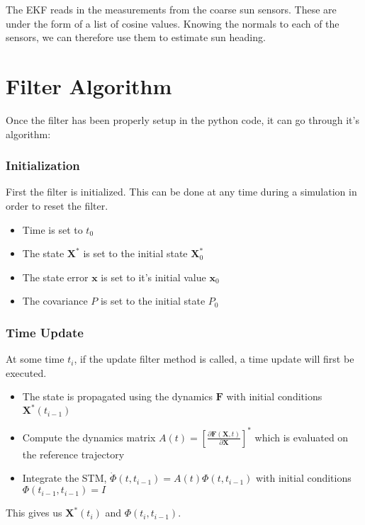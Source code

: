 \documentclass[]{BasiliskReportMemo}
\begin{document}
The EKF reads in the measurements from the coarse sun sensors. These are under the form of a list of cosine values. Knowing the normals to each of the sensors, we can therefore use them to estimate sun heading.

\section{Filter Algorithm}

Once the filter has been properly setup in the python code, it can go through it's algorithm:

\subsubsection*{Initialization}

First the filter is initialized. This can be done at any time during a simulation in order to reset 
the filter. 

\begin{itemize}
\item Time is set to $t_0$
\item The state $\bm X^*$ is set to the initial state  $\bm X_0^*$
\item The state error $\bm x$ is set to it's initial value $\bm x_0$
\item The covariance $P$ is set to the initial state  $P_0$
\end{itemize}


\subsubsection*{Time Update}

At some time $t_i$, if the update filter method is called, a time update will first be executed.

\begin{itemize}
\item The state is propagated using the dynamics $\bm F$ with initial conditions $\bm X^*(t_{i-1})$
\item Compute the dynamics matrix $A(t) = \left[\frac{\partial \bm F (\bm X, t)}{\partial \bm X}\right]^{*}$ which is evaluated on the reference trajectory
\item Integrate the STM, $\dot{\Phi}(t, t_{i-1}) = A(t) \Phi (t, t_{i-1})$ with initial conditions $\Phi(t_{i-1}, t_{i-1}) = I$
\end{itemize}

This gives us $\bm X^*(t_i)$ and $\Phi(t_{i}, t_{i-1})$.
\end{document}
